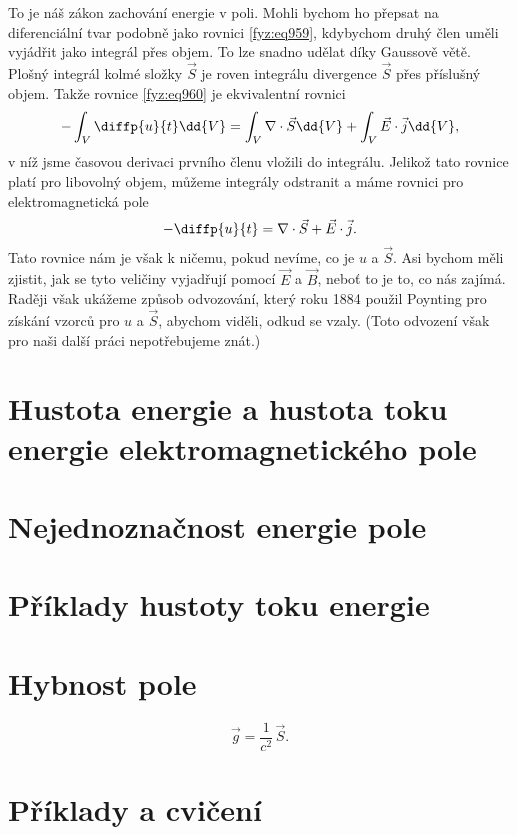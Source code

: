     To je náš zákon zachování energie v poli. Mohli bychom ho přepsat na diferenciální tvar podobně
    jako rovnici \eqref{fyz:eq959}, kdybychom druhý člen uměli vyjádřit jako integrál přes objem. To
    lze snadno udělat díky Gaussově větě. Plošný integrál kolmé složky \(\vec{S}\) je roven
    integrálu divergence \(\vec{S}\) přes příslušný objem. Takže rovnice \eqref{fyz:eq960} je
    ekvivalentní rovnici
    \begin{equation*}
      -\int_V\diffp{u}{t}\dd{V}=\int_V\nabla\cdot\vec{S}\dd{V}+\int_V\vec{E}\cdot\vec{j}\dd{V},
    \end{equation*}
    v níž jsme časovou derivaci prvního členu vložili do integrálu. Jelikož tato rovnice platí pro
    libovolný objem, můžeme integrály odstranit a máme rovnici pro elektromagnetická pole
    \begin{equation}\label{fyz:eq962}
      -\diffp{u}{t}=\nabla\cdot\vec{S}+\vec{E}\cdot\vec{j}.
    \end{equation}
    Tato rovnice nám je však k ničemu, pokud nevíme, co je \(u\) a \(\vec{S}\). Asi bychom měli
    zjistit, jak se tyto veličiny vyjadřují pomocí \(\vec{E}\) a \(\vec{B}\), neboť to je to, co nás
    zajímá. Raději však ukážeme způsob odvozování, který roku 1884 použil Poynting pro získání
    vzorců pro \(u\) a \(\vec{S}\), abychom viděli, odkud se vzaly. (Toto odvození však pro naši
    další práci nepotřebujeme znát.)

  \section{Hustota energie a hustota toku energie elektromagnetického 
    pole}\label{fyz:IIchapXXVIIsecIII}
  \section{Nejednoznačnost energie pole}\label{fyz:IIchapXXVIIsecIV}
  \section{Příklady hustoty toku energie}\label{fyz:IIchapXXVIIsecV}
  \section{Hybnost pole}\label{fyz:IIchapXXVIIsecVI}
    \begin{equation}\label{fyz:eq957}
      \vec{g}=\frac{1}{c^2}\,\vec{S}.
    \end{equation}
  \section{Příklady a cvičení}\label{fyz:IIchapXXVIIsecVII}





